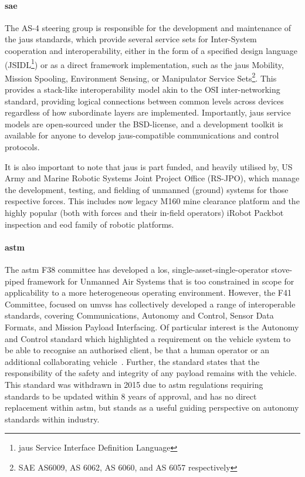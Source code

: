 \paragraph{\gls{sae}}

The AS-4 steering group is responsible for the development and maintenance of the \gls{jaus} standards, which provide several service sets for Inter-System cooperation and interoperability, either in the form of a specified design language (JSIDL\footnote{\gls{jaus} Service Interface Definition Language}) or as a direct framework implementation, such as the \gls{jaus} Mobility, Mission Spooling, Environment Sensing, or Manipulator Service Sets\footnote{SAE AS6009, AS 6062, AS 6060, and AS 6057 respectively}.
This provides a stack-like interoperability model akin to the OSI inter-networking standard, providing logical connections between common levels across devices regardless of how subordinate layers are implemented.
Importantly, \gls{jaus} service models are open-sourced under the BSD-license, and a development toolkit is available for anyone to develop \gls{jaus}-compatible communications and control protocols\cite{JTS}.

It is also important to note that \gls{jaus} is part funded, and heavily utilised by, US Army and Marine Robotic Systems Joint Project Office (RS-JPO), which manage the development, testing, and fielding of unmanned (ground) systems for those respective forces.\cite{JTS,Huang2004}
This includes now legacy M160 mine clearance platform and the highly popular (both with forces and their in-field operators) iRobot Packbot inspection and \gls{eod} family of robotic platforms.

\paragraph{\gls{astm}}

The \gls{astm} F38 committee has developed a \gls{los}, single-asset-single-operator stove-piped framework for Unmanned Air Systems that is too constrained in scope for applicability to a more heterogeneous operating environment\cite{AmericanSocietyofTestingandMaterials2007}.
However, the F41 Committee, focused on \glspl{umvs} has collectively developed a range of interoperable standards, covering Communications, Autonomy and Control, Sensor Data Formats, and Mission Payload Interfacing.
Of particular interest is the Autonomy and Control standard which highlighted a requirement on the vehicle system to be able to recognise an authorised client, be that a human operator or an additional collaborating vehicle~\cite{AmericanSocietyofTestingandMaterials2006}.
Further, the standard states that the responsibility of the safety and integrity of any payload remains with the vehicle.
This standard was withdrawn in 2015 due to \gls{astm} regulations requiring standards to be updated within 8 years of approval, and has no direct replacement within \gls{astm}, but stands as a useful guiding perspective on autonomy standards within industry.

